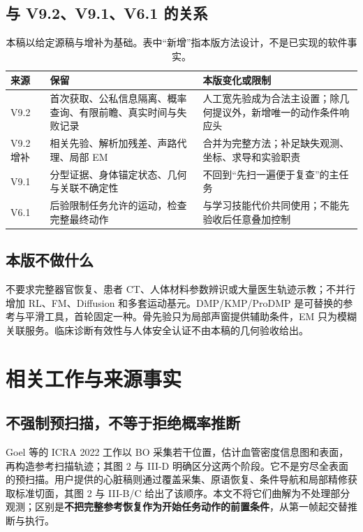 \documentclass[UTF8,fontset=fandol,11pt,a4paper]{ctexart}
\theoremstyle{plain}
\theoremstyle{definition}
\theoremstyle{remark}
\numberwithin{equation}{section}
\begin{document}
\subsection{与 V9.2、V9.1、V6.1 的关系}
\begin{table}[htbp]\centering\small
\begin{tabularx}{\linewidth}{P{24mm}YY}\toprule
来源 & 保留 & 本版变化或限制\\\midrule
V9.2 & 首次获取、公私信息隔离、概率查询、有限前瞻、真实时间与失败记录 & 人工宽先验成为合法主设置；除几何提议外，新增唯一的动作条件响应头\\
V9.2 增补 & 相关先验、解析加残差、声路代理、局部 EM & 合并为完整方法；补足缺失观测、坐标、求导和实验职责\\
V9.1 & 分型证据、身体锚定状态、几何与关联不确定性 & 不回到“先扫一遍便于复查”的主任务\\
V6.1 & 后验限制任务允许的运动，检查完整最终动作 & 与学习技能代价共同使用；不能先验收后任意叠加控制\\\bottomrule
\end{tabularx}
\caption{本稿以给定源稿与增补为基础。表中“新增”指本版方法设计，不是已实现的软件事实。}
\end{table}

\subsection{本版不做什么}
不要求完整器官恢复、患者 CT、人体材料参数辨识或大量医生轨迹示教；不并行增加 RL、FM、Diffusion 和多套运动基元。DMP/KMP/ProDMP 是可替换的参考与平滑工具，首轮固定一种。骨先验只为局部声窗提供辅助条件，EM 只为模糊关联服务。临床诊断有效性与人体安全认证不由本稿的几何验收给出。

\section{相关工作与来源事实}
\label{sec:related}
\subsection{不强制预扫描，不等于拒绝概率推断}
Goel 等的 ICRA 2022 工作以 BO 采集若干位置，估计血管密度信息图和表面，再构造参考扫描轨迹；其图 2 与 III-D 明确区分这两个阶段。它不是穷尽全表面的预扫描\cite{goel}。用户提供的心脏稿则通过覆盖采集、原语恢复、条件导航和局部精修获取标准切面，其图 2 与 III-B/C 给出了该顺序\cite{cardiac}。本文不将它们曲解为不处理部分观测；区别是\textbf{不把完整参考恢复作为开始任务动作的前置条件}，从第一帧起交替推断与执行。
\end{document}
